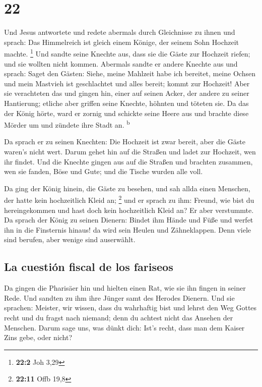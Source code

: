\hypertarget{section-21}{%
\section{22}\label{section-21}}

 Und Jesus antwortete und redete abermals durch
Gleichnisse zu ihnen und sprach:  Das Himmelreich ist
gleich einem Könige, der seinem Sohn Hochzeit machte. \footnote{\textbf{22:2}
  Joh 3,29}  Und sandte seine Knechte aus, dass sie die
Gäste zur Hochzeit riefen; und sie wollten nicht kommen. 
Abermals sandte er andere Knechte aus und sprach: Saget den Gästen:
Siehe, meine Mahlzeit habe ich bereitet, meine Ochsen und mein Mastvieh
ist geschlachtet und alles bereit; kommt zur Hochzeit! 
Aber sie verachteten das und gingen hin, einer auf seinen Acker, der
andere zu seiner Hantierung;  etliche aber griffen seine
Knechte, höhnten und töteten sie.  Da das der König hörte,
ward er zornig und schickte seine Heere aus und brachte diese Mörder um
und zündete ihre Stadt an. \textsuperscript{b}

 Da sprach er zu seinen Knechten: Die Hochzeit ist zwar
bereit, aber die Gäste waren's nicht wert.  Darum gehet
hin auf die Straßen und ladet zur Hochzeit, wen ihr findet.
 Und die Knechte gingen aus auf die Straßen und brachten
zusammen, wen sie fanden, Böse und Gute; und die Tische wurden alle
voll.

 Da ging der König hinein, die Gäste zu besehen, und sah
allda einen Menschen, der hatte kein hochzeitlich Kleid an; \footnote{\textbf{22:11}
  Offb 19,8}  und er sprach zu ihm: Freund, wie bist du
hereingekommen und hast doch kein hochzeitlich Kleid an? Er aber
verstummte.  Da sprach der König zu seinen Dienern:
Bindet ihm Hände und Füße und werfet ihn in die Finsternis hinaus! da
wird sein Heulen und Zähneklappen.  Denn viele sind
berufen, aber wenige sind auserwählt.

\hypertarget{la-cuestiuxf3n-fiscal-de-los-fariseos}{%
\subsection{La cuestión fiscal de los
fariseos}\label{la-cuestiuxf3n-fiscal-de-los-fariseos}}

 Da gingen die Pharisäer hin und hielten einen Rat, wie
sie ihn fingen in seiner Rede.  Und sandten zu ihm ihre
Jünger samt des Herodes Dienern. Und sie sprachen: Meister, wir wissen,
dass du wahrhaftig bist und lehrst den Weg Gottes recht und du fragst
nach niemand; denn du achtest nicht das Ansehen der Menschen.
 Darum sage uns, was dünkt dich: Ist's recht, dass man
dem Kaiser Zins gebe, oder nicht?

